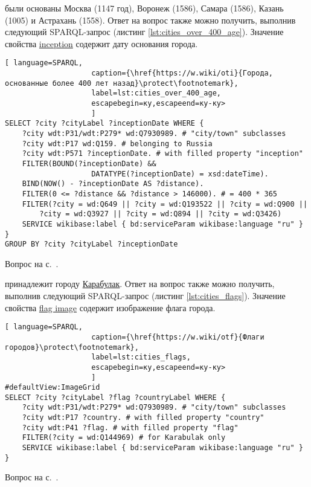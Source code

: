 \begin{task}
    \label{answer:cities_over_400_age}
     были основаны Москва (1147 год), Воронеж (1586), Самара (1586), Казань (1005) и Астрахань (1558). Ответ на вопрос также можно получить, выполнив следующий SPARQL-запрос (листинг \ref{lst:cities_over_400_age}). Значение свойства \href{https://www.wikidata.org/wiki/Property:P571}{inception} содержит дату основания города.
    \begin{lstlisting}[ language=SPARQL, 
                    caption={\href{https://w.wiki/oti}{Города, основанные более 400 лет назад}\protect\footnotemark},
                    label=lst:cities_over_400_age, 
                    escapebegin=ку,escapeend=ку-ку>
                    ]
SELECT ?city ?cityLabel ?inceptionDate WHERE {
	?city wdt:P31/wdt:P279* wd:Q7930989. # "city/town" subclasses
	?city wdt:P17 wd:Q159. # belonging to Russia
	?city wdt:P571 ?inceptionDate. # with filled property "inception"
	FILTER(BOUND(?inceptionDate) && 
					DATATYPE(?inceptionDate) = xsd:dateTime).
	BIND(NOW() - ?inceptionDate AS ?distance).
	FILTER(0 <= ?distance && ?distance > 146000). # = 400 * 365
	FILTER(?city = wd:Q649 || ?city = wd:Q193522 || ?city = wd:Q900 ||
		?city = wd:Q3927 || ?city = wd:Q894 || ?city = wd:Q3426)
	SERVICE wikibase:label { bd:serviceParam wikibase:language "ru" }
}
GROUP BY ?city ?cityLabel ?inceptionDate    
\end{lstlisting}

    \small{Вопрос на с.~\pageref{fig:city_relation_Russia_S_N}.}
\end{task}

\begin{task}
    \label{answer:cities_flags}
     принадлежит городу \href{https://w.wiki/oLF}{Карабулак}. Ответ на вопрос также можно получить, выполнив следующий SPARQL-запрос (листинг \ref{lst:cities_flags}). Значение свойства \href{https://www.wikidata.org/wiki/Property:P41}{flag image} содержит изображение флага города.
    
    \begin{lstlisting}[ language=SPARQL, 
                    caption={\href{https://w.wiki/otf}{Флаги городов}\protect\footnotemark},
                    label=lst:cities_flags, 
                    escapebegin=ку,escapeend=ку-ку>
                    ]
#defaultView:ImageGrid
SELECT ?city ?cityLabel ?flag ?countryLabel WHERE {
	?city wdt:P31/wdt:P279* wd:Q7930989. # "city/town" subclasses
	?city wdt:P17 ?country. # with filled property "country"
	?city wdt:P41 ?flag. # with filled property "flag"
	FILTER(?city = wd:Q144969) # for Karabulak only
	SERVICE wikibase:label { bd:serviceParam wikibase:language "ru" }
}
\end{lstlisting}
    
    \small{Вопрос на с.~\pageref{lst:countries_sister_cities_with_Russia}.}
\end{task}

